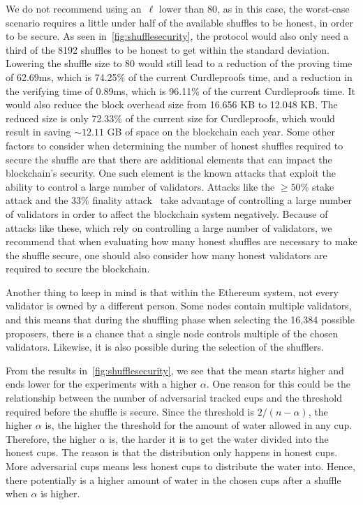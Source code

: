 We do not recommend using an~$\ell$ lower than 80, as in this case, the worst-case scenario requires a little under half of the available shuffles to be honest, in order to be secure.
As seen in~\autoref{fig:shufflesecurity}, the protocol would also only need a third of the 8192 shuffles to be honest to get within the standard deviation.
Lowering the shuffle size to 80 would still lead to a reduction of the proving time of 62.69ms, which is 74.25\% of the current Curdleproofs time, and a reduction in the verifying time of 0.89ms, which is 96.11\% of the current Curdleproofs time.
It would also reduce the block overhead size from 16.656 KB to 12.048 KB\@.
The reduced size is only 72.33\% of the current size for Curdleproofs, which would result in saving $\sim12.11$ GB of space on the blockchain each year.
Some other factors to consider when determining the number of honest shuffles required to secure the shuffle are that there are additional elements that can impact the blockchain's security.
One such element is the known attacks that exploit the ability to control a large number of validators.
Attacks like the $\geq50\%$ stake attack and the $33\%$ finality attack~\cite{EthereumAttackDefense2024} take advantage of controlling a large number of validators in order to affect the blockchain system negatively.
Because of attacks like these, which rely on controlling a large number of validators, we recommend that when evaluating how many honest shuffles are necessary to make the shuffle secure, one should also consider how many honest validators are required to secure the blockchain.

Another thing to keep in mind is that within the Ethereum system, not every validator is owned by a different person.
Some nodes contain multiple validators, and this means that during the shuffling phase when selecting the 16,384 possible proposers, there is a chance that a single node controls multiple of the chosen validators.
Likewise, it is also possible during the selection of the shufflers.

From the results in~\autoref{fig:shufflesecurity}, we see that the mean starts higher and ends lower for the experiments with a higher $\alpha$.
One reason for this could be the relationship between the number of adversarial tracked cups and the threshold required before the shuffle is secure.
Since the threshold is $2/(n-\alpha)$, the higher $\alpha$ is, the higher the threshold for the amount of water allowed in any cup.
Therefore, the higher $\alpha$ is, the harder it is to get the water divided into the honest cups.
The reason is that the distribution only happens in honest cups.
More adversarial cups means less honest cups to distribute the water into.
Hence, there potentially is a higher amount of water in the chosen cups after a shuffle when $\alpha$ is higher. 
